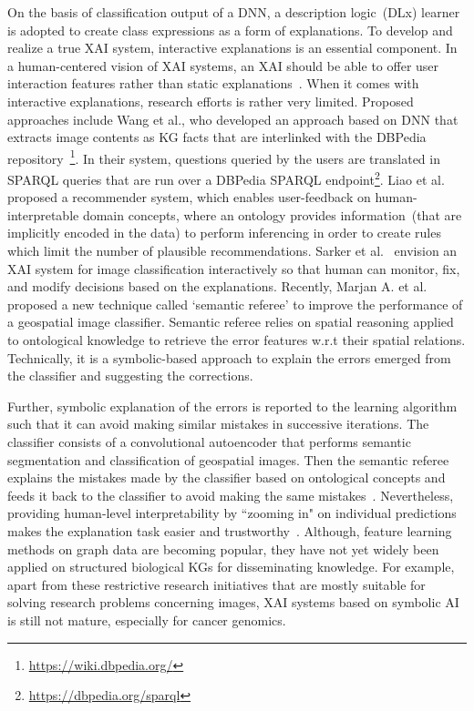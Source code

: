 \hspace*{3.5mm} On the basis of classification output of a DNN, a description logic~(DLx) learner is adopted to create class expressions as a form of explanations. To develop and realize a true XAI system, interactive explanations is an essential component. In a human-centered vision of XAI systems, an XAI should be able to offer user interaction features rather than static explanations~\cite{futia2020integration}. When it comes with interactive explanations, research efforts is rather very limited. Proposed approaches include Wang et al.\cite{wang2015explicit}, who developed an approach based on DNN that extracts image contents as KG facts that are interlinked with the DBPedia repository~\cite{lehmann2015dbpedia}\footnote{\url{https://wiki.dbpedia.org/}}. In their system, questions queried by the users are translated in SPARQL queries that are run over a DBPedia SPARQL endpoint\footnote{\url{https://dbpedia.org/sparql}}. Liao et al.~\cite{liao2018interpretable} proposed a recommender system, which enables user-feedback on human-interpretable domain concepts, where an ontology  provides information~(that are implicitly encoded in the data) to perform inferencing in order to create rules which limit the number of plausible recommendations. Sarker et al.~\cite{sarker2017explaining} envision an XAI system for image classification interactively so that  human can monitor, fix, and modify decisions based on the explanations. Recently, Marjan A. et al.~\cite{alirezaie2019semantic} proposed a new technique called `semantic referee' to improve the performance of a geospatial image classifier. Semantic referee relies on spatial reasoning applied to ontological knowledge to retrieve the error features w.r.t their spatial relations. Technically, it is a symbolic-based approach to explain the errors emerged from the classifier and suggesting the corrections. 

\hspace*{3.5mm} Further, symbolic explanation of the errors is reported to the learning algorithm such that it can avoid making similar mistakes in successive iterations. The classifier consists of a convolutional autoencoder that performs semantic segmentation and classification of geospatial images. Then the semantic referee explains the mistakes made by the classifier based on ontological concepts and feeds it back to the classifier to avoid making the same mistakes~\cite{alirezaie2019semantic}. Nevertheless, providing human-level interpretability by ``zooming in" on individual predictions makes the explanation task easier and trustworthy~\cite{ribeiro2018anchors}. Although, feature learning methods on graph data are becoming popular, they have not yet widely been applied on structured biological KGs for disseminating knowledge. For example, apart from these restrictive research initiatives that are mostly suitable for solving research problems concerning images, XAI systems based on symbolic AI is still not mature, especially for cancer genomics. 

